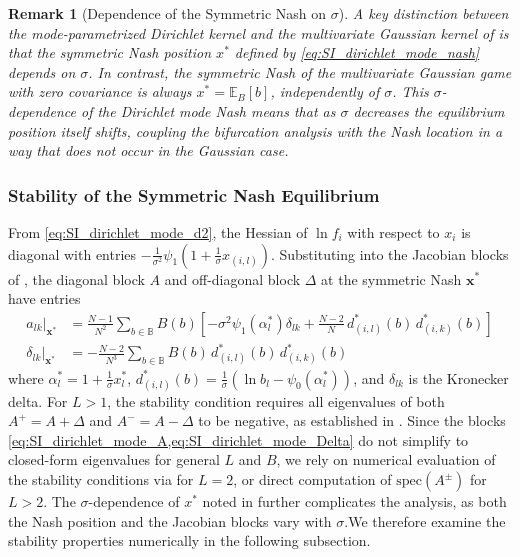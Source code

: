 \documentclass{article}
\newtheorem{remark}{Remark}
\begin{document}
        \begin{remark}[Dependence of the Symmetric Nash on $\sigma$]\label{rem:SI_dirichlet_mode_sigma_dependence}
            A key distinction between the mode-parametrized Dirichlet kernel and the multivariate Gaussian kernel of  is that the symmetric Nash position $x^*$ defined by \cref{eq:SI_dirichlet_mode_nash} depends on $\sigma$. In contrast, the symmetric Nash of the multivariate Gaussian game with zero covariance is always $x^* = \mathbb{E}_B[b]$, independently of $\sigma$. This $\sigma$-dependence of the Dirichlet mode Nash means that as $\sigma$ decreases the equilibrium position itself shifts, coupling the bifurcation analysis with the Nash location in a way that does not occur in the Gaussian case.
        \end{remark}

    \subsubsection{Stability of the Symmetric Nash Equilibrium}\label{subsubsec:SI_dirichlet_mode_stability}

        From \cref{eq:SI_dirichlet_mode_d2}, the Hessian of $\ln f_i$ with respect to $x_i$ is diagonal with entries $-\frac{1}{\sigma^2}\psi_1(1+\frac{1}{\sigma} x_{(i,l)})$. Substituting into the Jacobian blocks of , the diagonal block $A$ and off-diagonal block $\Delta$ at the symmetric Nash $\mathbf{x}^*$ have entries
        \begin{align}
            a_{lk}\big|_{\mathbf{x}^*}
            &= \frac{N-1}{N^2}\sum_{b\in\mathbb{B}} B(b)
            \left[-\sigma^2\psi_1(\alpha_l^*)\delta_{lk}
            + \frac{N-2}{N}\,d_{(i,l)}^*(b)\,d_{(i,k)}^*(b)\right]
            \label{eq:SI_dirichlet_mode_A} \\
            \delta_{lk}\big|_{\mathbf{x}^*}
            &= -\frac{N-2}{N^3}\sum_{b\in\mathbb{B}} B(b)\,d_{(i,l)}^*(b)\,d_{(i,k)}^*(b)
            \label{eq:SI_dirichlet_mode_Delta}
        \end{align}
        where $\alpha_l^* = 1 + \frac{1}{\sigma} x_l^*$, $d_{(i,l)}^*(b) = \frac{1}{\sigma}(\ln b_l - \psi_0(\alpha_l^*))$, and $\delta_{lk}$ is the Kronecker delta. For $L > 1$, the stability condition requires all eigenvalues of both $A^+ = A + \Delta$ and $A^- = A - \Delta$ to be negative, as established in . Since the blocks \cref{eq:SI_dirichlet_mode_A,eq:SI_dirichlet_mode_Delta} do not simplify to closed-form eigenvalues for general $L$ and $B$, we rely on numerical evaluation of the stability conditions via  for $L = 2$, or direct computation of $\mathrm{spec}(A^\pm)$ for $L > 2$. The $\sigma$-dependence of $x^*$ noted in  further complicates the analysis, as both the Nash position and the Jacobian blocks vary with $\sigma$.We therefore examine the stability properties numerically in the following subsection.
\end{document}
